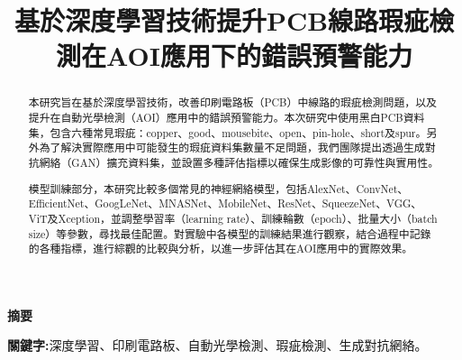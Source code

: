 \title{\fontsize{14}{0} \bf 基於深度學習技術提升PCB線路瑕疵檢測在AOI應用下的錯誤預警能力}
\author{
}
\maketitle %
\begin{flushleft}
  {\fontsize{12}{0} \bf 摘要}
\end{flushleft}
%
%
\begin{abstract}
  \hspace{2em}
  本研究旨在基於深度學習技術，改善印刷電路板（PCB）中線路的瑕疵檢測問題，以及提升在自動光學檢測（AOI）應用中的錯誤預警能力。本次研究中使用黑白PCB資料集，包含六種常見瑕疵：copper、good、mousebite、open、pin-hole、short及spur。另外為了解決實際應用中可能發生的瑕疵資料集數量不足問題，我們團隊提出透過生成對抗網絡（GAN）擴充資料集，並設置多種評估指標以確保生成影像的可靠性與實用性。
\end{abstract}
\begin{abstract}
  \hspace{2em}
  模型訓練部分，本研究比較多個常見的神經網絡模型，包括AlexNet、ConvNet、EfficientNet、GoogLeNet、MNASNet、MobileNet、ResNet、SqueezeNet、VGG、ViT及Xception，並調整學習率（learning rate）、訓練輪數（epoch）、批量大小（batch size）等參數，尋找最佳配置。對實驗中各模型的訓練結果進行觀察，結合過程中記錄的各種指標，進行綜觀的比較與分析，以進一步評估其在AOI應用中的實際效果。
\end{abstract}
\begin{IEEEkeywords}
    {\fontsize{10}{0} \bf 關鍵字:}深度學習、印刷電路板、自動光學檢測、瑕疵檢測、生成對抗網絡。
\end{IEEEkeywords}
\IEEEpeerreviewmaketitle
